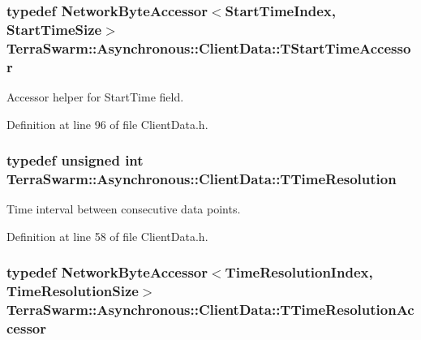 \hypertarget{class_terra_swarm_1_1_asynchronous_1_1_client_data_a9d8f2e887da6bef7fc623b4ca8e2cf57}{
\subsubsection[{T\-Start\-Time\-Accessor}]{\setlength{\rightskip}{0pt plus 5cm}typedef {\bf Network\-Byte\-Accessor}$<${\bf Start\-Time\-Index}, {\bf Start\-Time\-Size}$>$ {\bf Terra\-Swarm\-::\-Asynchronous\-::\-Client\-Data\-::\-T\-Start\-Time\-Accessor}\hspace{0.3cm}{\ttfamily [private]}}}\label{class_terra_swarm_1_1_asynchronous_1_1_client_data_a9d8f2e887da6bef7fc623b4ca8e2cf57}


Accessor helper for Start\-Time field. 



Definition at line 96 of file Client\-Data.\-h.

\hypertarget{class_terra_swarm_1_1_asynchronous_1_1_client_data_a626a7d114c405bceb24262253fe36c71}{
\subsubsection[{T\-Time\-Resolution}]{\setlength{\rightskip}{0pt plus 5cm}typedef unsigned int {\bf Terra\-Swarm\-::\-Asynchronous\-::\-Client\-Data\-::\-T\-Time\-Resolution}}}\label{class_terra_swarm_1_1_asynchronous_1_1_client_data_a626a7d114c405bceb24262253fe36c71}


Time interval between consecutive data points. 



Definition at line 58 of file Client\-Data.\-h.

\hypertarget{class_terra_swarm_1_1_asynchronous_1_1_client_data_acda5940545173f5f000e8eb0fdb8c712}{
\subsubsection[{T\-Time\-Resolution\-Accessor}]{\setlength{\rightskip}{0pt plus 5cm}typedef {\bf Network\-Byte\-Accessor}$<${\bf Time\-Resolution\-Index}, {\bf Time\-Resolution\-Size}$>$ {\bf Terra\-Swarm\-::\-Asynchronous\-::\-Client\-Data\-::\-T\-Time\-Resolution\-Accessor}\hspace{0.3cm}{\ttfamily [private]}}}\label{class_terra_swarm_1_1_asynchronous_1_1_client_data_acda5940545173f5f000e8eb0fdb8c712}


